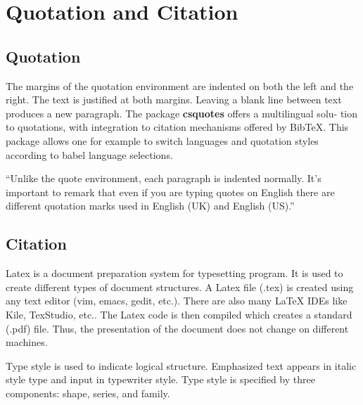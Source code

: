 \documentclass[12pt,a4paper]{article}
\begin{document}
{

\section{Quotation and Citation}
\subsection{Quotation}
The margins of the quotation environment are indented on both the left and the
right. The text is justified at both margins. Leaving a blank line between text
produces a new paragraph. The package \textbf{csquotes} offers a multilingual solu-
tion to quotations, with integration to citation mechanisms offered by BibTeX.
This package allows one for example to switch languages and quotation styles
according to babel language selections.
\\

\setlength{\leftskip}{1cm}
\setlength{\rightskip}{1cm}

{“Unlike the quote environment, each paragraph is indented normally. It’s important to remark that even if you are typing quotes on English there are different quotation marks used in English (UK) and English (US).”}

\setlength{\leftskip}{0cm}
\setlength{\rightskip}{0cm}

\subsection{Citation}
Latex\cite{firuza_aibara} is a document preparation system for typesetting program. It is used
to create different types of document structures. A Latex file (.tex) is created
using any text editor (vim, emacs, gedit, etc.). There are also many LaTeX IDEs
like Kile, TexStudio, etc.. The Latex code is then compiled which creates a
standard (.pdf) file. Thus, the presentation of the document does not change on
different machines.

Type style\cite{latex_leslie} is used to indicate logical structure. Emphasized text appears in
italic style type and input in typewriter style. Type style is specified by three
components: shape, series, and family.

}
\end{document}
